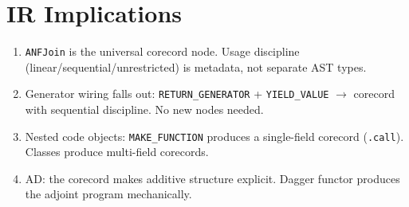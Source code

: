 \documentclass[11pt,a4paper]{article}
\begin{document}
\section{IR Implications}

\begin{enumerate}[nosep]
  \item \texttt{ANFJoin} is the universal corecord node. Usage
    discipline (linear/sequential/unrestricted) is metadata, not
    separate AST types.
  \item Generator wiring falls out: \texttt{RETURN\_GENERATOR} +
    \texttt{YIELD\_VALUE} $\to$ corecord with sequential discipline.
    No new nodes needed.
  \item Nested code objects: \texttt{MAKE\_FUNCTION} produces a
    single-field corecord (\texttt{.call}). Classes produce
    multi-field corecords.
  \item AD: the corecord makes additive structure explicit. Dagger
    functor produces the adjoint program mechanically.
\end{enumerate}
\end{document}
